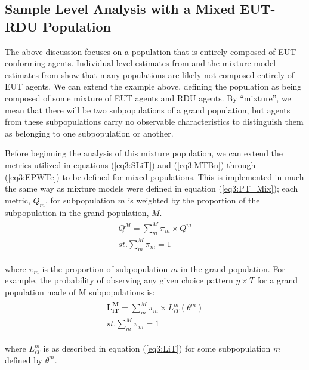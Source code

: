 \documentclass[../main.tex]{subfiles}
\begin{document}
\subsection{Sample Level Analysis with a Mixed EUT-RDU Population}

The above discussion focuses on a population that is entirely composed of EUT conforming agents.
Individual level estimates from \textcite{Hey1994} and the mixture model estimates from \textcite{Harrison2008a} show that many populations are likely not composed entirely of EUT agents.
We can extend the example above, defining the population as being composed of some mixture of EUT agents and RDU agents.
By \enquote{mixture}, we mean that there will be two subpopulations of a grand population, but agents from these subpopulations carry no observable characteristics to distinguish them as belonging to one subpopulation or another.


Before beginning the analysis of this mixture population, we can extend the metrics utilized in equations (\ref{eq3:SLiT}) and (\ref{eq3:MTBn}) through (\ref{eq3:EPWTe}) to be defined for mixed populations.
This is implemented in much the same way as mixture models were defined in equation (\ref{eq3:PT_Mix}); each metric, $Q_m$, for subpopulation $m$ is weighted by the proportion of the subpopulation in the grand population, $M$.
\begin{align}
	\label{eq3:Metric_Mix}
	\begin{split}
		\bm{\mathit{Q^M}} = \sum_m^M \pi_m \times Q^m \\
		\mathit{st.} \sum_m^M \pi_m = 1
	\end{split}
\end{align}

\noindent where $\pi_m$ is the proportion of subpopulation $m$ in the grand population.
For example, the probability of observing any given choice pattern $y \times T$ for a grand population made of M subpopulations is:
\begin{align}
	\label{eq3:LnT_Mix}
	\begin{split}
		\bm{L_{iT}^M} = \sum_m^M \pi_m \times L_{iT}^m(\theta^m) \\
		\mathit{st.} \sum_m^M \pi_m = 1
	\end{split}
\end{align}

\noindent where $L_{iT}^m$ is as described in equation (\ref{eq3:LiT}) for some subpopulation $m$ defined by $\theta^m$.
\end{document}
